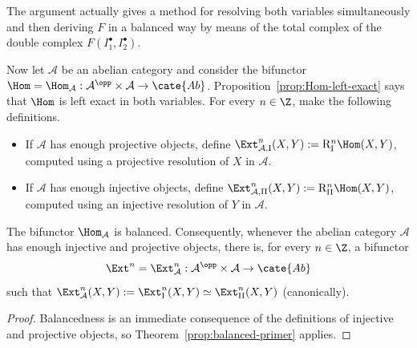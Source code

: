 \begin{remark}\label{rem:balanced-primer}
The argument actually gives a method for resolving both variables
simultaneously and then deriving $F$ in a balanced way by means of the total
complex of the double complex $F(I_1^\bullet,I_2^\bullet)$.
\end{remark}

Now let $\mathcal{A}$ be an abelian category and consider the bifunctor
$\Hom=\Hom_{\mathcal{A}}:\mathcal{A}^{\opp}\times\mathcal{A}\to\cate{Ab}$.
Proposition~\ref{prop:Hom-left-exact} says that $\Hom$ is left exact in both
variables. For every $n\in\Z$, make the following definitions.

\begin{itemize}
\item If $\mathcal{A}$ has enough projective objects, define
$\Ext^n_{\mathcal{A},\mathrm{I}}(X,Y):=\mathrm{R}^n_{\mathrm{I}}\Hom(X,Y)$,
computed using a projective resolution of $X$ in $\mathcal{A}$.
\item If $\mathcal{A}$ has enough injective objects, define
$\Ext^n_{\mathcal{A},\mathrm{II}}(X,Y):=\mathrm{R}^n_{\mathrm{II}}\Hom(X,Y)$,
computed using an injective resolution of $Y$ in $\mathcal{A}$.
\end{itemize}

\begin{definition-proposition}\label{def:Ext-classical}
The bifunctor $\Hom_{\mathcal{A}}$ is balanced. Consequently, whenever the
abelian category $\mathcal{A}$ has enough injective and projective objects,
there is, for every $n\in\Z$, a bifunctor
\[
\Ext^n=\Ext^n_{\mathcal{A}}:\mathcal{A}^{\opp}\times\mathcal{A}\to\cate{Ab}
\]
such that
$\Ext^n_{\mathcal{A}}(X,Y):=\Ext^n_{\mathrm{I}}(X,Y)\simeq
\Ext^n_{\mathrm{II}}(X,Y)$ (canonically).
\end{definition-proposition}

\begin{proof}
Balancedness is an immediate consequence of the definitions of injective and
projective objects, so Theorem~\ref{prop:balanced-primer} applies.
\end{proof}

